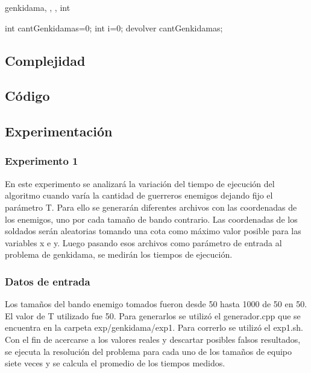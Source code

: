 	\begin{algoritmo}{genkidama}{, , , }{int}

		int cantGenkidamas=0;
  		int i=0;
  		devolver cantGenkidamas; \;
	\end{algoritmo} \;
	




    \subsection{Complejidad}


    \subsection{Código}


    \subsection{Experimentación}


    	\subsubsection*{Experimento 1}
			En este experimento se analizará la variación del tiempo de ejecución del algoritmo cuando varía la cantidad de guerreros enemigos dejando fijo el parámetro T. Para ello se generarán diferentes archivos con las coordenadas de los enemigos, uno por cada tamaño de bando contrario. Las coordenadas de los soldados serán aleatorias tomando una cota como máximo valor posible para las variables x e y. Luego pasando esos archivos como parámetro de entrada al problema de genkidama, se medirán los tiempos de ejecución. \\

		\subsubsection*{Datos de entrada}
			Los tamaños del bando enemigo tomados fueron  desde 50 hasta 1000 de 50 en 50. 
			El valor de T utilizado fue 50.
			Para generarlos se utilizó el generador.cpp que se encuentra en la carpeta exp/genkidama/exp1.
			Para correrlo se utilizó el exp1.sh.
			Con el fin de acercarse a los valores reales y descartar posibles falsos resultados, se ejecuta la resolución del problema para cada uno de los tamaños de equipo siete veces y se calcula el promedio de los tiempos medidos.

